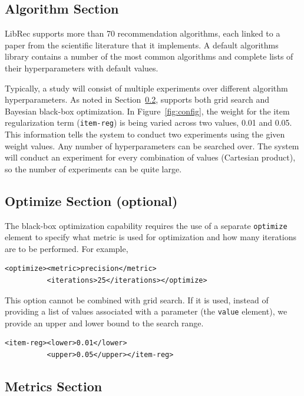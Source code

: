 \subsection{Algorithm Section}
\label{subsec:libauto_algos}
LibRec supports more than 70 recommendation algorithms, each linked to a paper from the scientific literature that it implements. A default algorithms library contains a number of the most common algorithms and complete lists of their hyperparameters with default values.

Typically, a study will consist of multiple experiments over different algorithm hyperparameters. As noted in Section~\ref{subsec:libauto_opt}, \libauto{} supports both grid search and Bayesian black-box optimization. In Figure~\ref{fig:config}, the weight for the item regularization term (\texttt{item-reg}) is being varied across two values, 0.01 and 0.05. This information tells the system to conduct two experiments using the given weight values. Any number of hyperparameters can be searched over. The system will conduct an experiment for every combination of values (Cartesian product), so the number of experiments can be quite large.

\subsection{Optimize Section (optional)}
\label{subsec:libauto_opt}
The black-box optimization capability requires the use of a separate \texttt{optimize} element to specify what metric is used for optimization and how many iterations are to be performed. For example,

{\small
\begin{verbatim}
<optimize><metric>precision</metric>
          <iterations>25</iterations></optimize>
\end{verbatim}}

This option cannot be combined with grid search. If it is used, instead of providing a list of values associated with a parameter (the \texttt{value} element), we provide an upper and lower bound to the search range.

{\small
\begin{verbatim}
<item-reg><lower>0.01</lower>
          <upper>0.05</upper></item-reg>
\end{verbatim}}

\subsection{Metrics Section}
\label{subsec:libauto_metrics}

